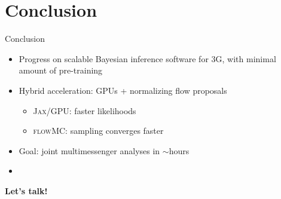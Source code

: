 \documentclass[usenames,dvipsnames,t]{beamer}
\begin{document}
\section{Conclusion}

\begin{frame}{Conclusion}
  \def\x{4mm}
  \def\y{1mm}

  \begin{itemize}
    \item Progress on scalable Bayesian inference software for 3G, with minimal amount of pre-training

    \vspace{\x}

    \item Hybrid acceleration: GPUs + normalizing flow proposals
    \begin{itemize}
      \vspace{\y}
      \item \textsc{Jax}/GPU: faster likelihoods

      \vspace{\y}

      \item \textsc{flowMC}: sampling converges faster
    \end{itemize}

    \vspace{\x}

    \item Goal: joint multimessenger analyses in $\sim$hours

    \vspace{\x}

    \vspace{\y}

    \item {}
  \end{itemize}
  
  \vspace{4mm}

  \textbf{Let's talk!}
\end{frame}
\end{document}
